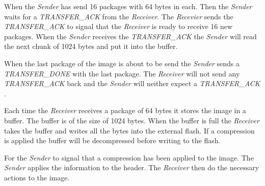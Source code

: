 When the \emph{Sender} has send 16 packages with 64 bytes in each. Then the \emph{Sender} waits for a \emph{TRANSFER\_ACK } from the \emph{Receiver}. The \emph{Recevier} sends the \emph{TRANSFER\_ACK } to signal that the \emph{Receiver} is ready to receive 16 new packages. When the \emph{Sender} receives the \emph{TRANSFER\_ACK } the \emph{Sender} will read the next chunk of 1024 bytes and put it into the buffer.

When the last package of the image is about to be send the \emph{Sender} sends a \emph{TRANSFER\_DONE} with the last package. The \emph{Receiver} will not send any \emph{TRANSFER\_ACK} back and the \emph{Sender} will neither expect a \emph{TRANSFER\_ACK }.

Each time the \emph{Receiver} receives a package of 64 bytes it stores the image in a buffer. The buffer is of the size of 1024 bytes. When the buffer is full the \emph{Receiver} takes the buffer and writes all the bytes into the external flash. If a compression is applied the buffer will be decompressed before writing to the flash.

For the \emph{Sender} to signal that a compression has been applied to the image. The \emph{Sender} applies the information to the header. The \emph{Receiver} then do the necessary actions to the image.